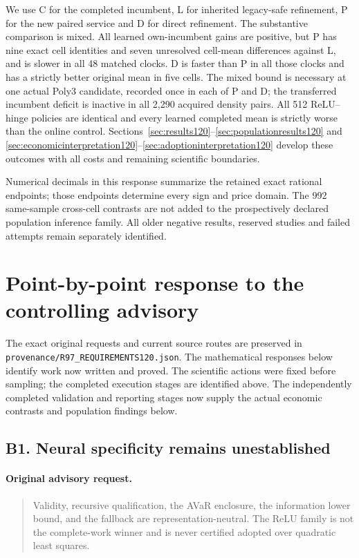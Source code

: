 We use C for the completed incumbent, L for inherited legacy-safe
refinement, P for the new paired service and D for direct refinement.
The substantive comparison is mixed. All learned own-incumbent gains are
positive, but P has nine exact cell identities and seven unresolved
cell-mean differences against L, and is slower in all 48 matched clocks.
D is faster than P in all those clocks and has a strictly better original
mean in five cells. The mixed bound is necessary at one actual Poly3
candidate, recorded once in each of P and D; the transferred incumbent
deficit is inactive in all 2,290 acquired density pairs. All 512
ReLU--hinge policies are identical and every learned completed mean is
strictly worse than the online control. Sections~\ref{sec:results120}--\ref{sec:populationresults120}
and \ref{sec:economicinterpretation120}--\ref{sec:adoptioninterpretation120}
develop these outcomes with all costs and remaining scientific boundaries.

Numerical decimals in this response summarize the retained exact rational
endpoints; those endpoints determine every sign and price domain. The 992
same-sample cross-cell contrasts are not added to the prospectively declared
population inference family. All older negative results, reserved studies
and failed attempts remain separately identified.

\section{Point-by-point response to the controlling advisory}
The exact original requests and current source routes are preserved in
\nolinkurl{provenance/R97_REQUIREMENTS120.json}. The mathematical responses
below identify work now written and proved. The scientific actions were
fixed before sampling; the completed execution stages are identified above.
The independently completed validation and reporting stages now supply
the actual economic contrasts and population findings below.

\subsection{B1. Neural specificity remains unestablished}
\label{response120:B1}
\paragraph{Original advisory request.}
\begin{quote}
Validity, recursive qualification, the AVaR enclosure, the information lower bound, and the fallback are representation-neutral. The ReLU family is not the complete-work winner and is never certified adopted over quadratic least squares.
\end{quote}
